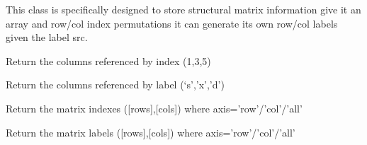\documentclass[a4paper,11pt,english]{sphinxmanual}
\begin{document}
\begin{fulllineitems}
\label{modules_doc:cbmpy.PyscesStoich.StructMatrix}
This class is specifically designed to store structural matrix information
give it an array and row/col index permutations it can generate its own
row/col labels given the label src.

\begin{fulllineitems}
\label{modules_doc:cbmpy.PyscesStoich.StructMatrix.getColsByIdx}
Return the columns referenced by index (1,3,5)

\end{fulllineitems}


\begin{fulllineitems}
\label{modules_doc:cbmpy.PyscesStoich.StructMatrix.getColsByName}
Return the columns referenced by label (`s','x','d')

\end{fulllineitems}


\begin{fulllineitems}
\label{modules_doc:cbmpy.PyscesStoich.StructMatrix.getIndexes}
Return the matrix indexes ({[}rows{]},{[}cols{]}) where axis='row'/'col'/'all'

\end{fulllineitems}


\begin{fulllineitems}
\label{modules_doc:cbmpy.PyscesStoich.StructMatrix.getLabels}
Return the matrix labels ({[}rows{]},{[}cols{]}) where axis='row'/'col'/'all'

\end{fulllineitems}



\end{fulllineitems}
\end{document}
